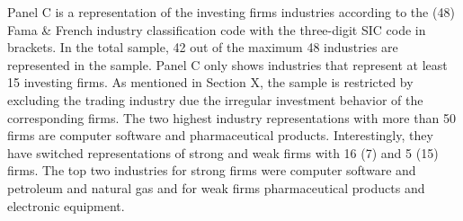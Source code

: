 \documentclass[12pt]{article}
\begin{document}
Panel C is a representation of the investing firms industries according to the (48) Fama \& French industry classification code with the three-digit SIC code in brackets. In the total sample, 42 out of the maximum 48 industries are represented in the sample. Panel C only shows industries that represent at least 15 investing firms. As mentioned in Section X, the sample is restricted by excluding the trading industry due the irregular investment behavior of the corresponding firms. The two highest industry representations with more than 50 firms are computer software and pharmaceutical products. Interestingly, they have switched representations of strong and weak firms with 16 (7) and 5 (15) firms. The top two industries for strong firms were computer software and petroleum and natural gas and for weak firms pharmaceutical products and electronic equipment. 

\end{document}
